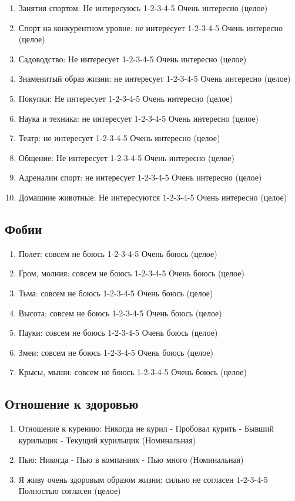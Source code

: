 \documentclass[11pt]{article}
\begin{document}
\begin{enumerate}
\item Занятия спортом: Не интересуюсь 1-2-3-4-5 Очень интересно (целое)
\item Спорт на конкурентном уровне: не интересует 1-2-3-4-5 Очень интересно (целое)
\item Садоводство: Не интересует 1-2-3-4-5 Очень интересно (целое)
\item Знаменитый образ жизни: не интересует 1-2-3-4-5 Очень интересно (целое)
\item Покупки: Не интересует 1-2-3-4-5 Очень интересно (целое)
\item Наука и техника: не интересует 1-2-3-4-5 Очень интересно (целое)
\item Театр: не интересует 1-2-3-4-5 Очень интересно (целое)
\item Общение: Не интересует 1-2-3-4-5 Очень интересно (целое)
\item Адреналин спорт: не интересует 1-2-3-4-5 Очень интересно (целое)
\item Домашние животные: Не интересуются 1-2-3-4-5 Очень интересно (целое)
\end{enumerate}
\subsection{Фобии}
\begin{enumerate}
\item Полет: совсем не боюсь 1-2-3-4-5 Очень боюсь (целое)
\item Гром, молния: совсем не боюсь 1-2-3-4-5 Очень боюсь (целое)
\item Тьма: совсем не боюсь 1-2-3-4-5 Очень боюсь  (целое)
\item Высота: совсем не боюсь  1-2-3-4-5 Очень боюсь  (целое)
\item Пауки: совсем не боюсь 1-2-3-4-5 Очень боюсь  (целое)
\item Змеи: совсем не боюсь 1-2-3-4-5 Очень боюсь  (целое)
\item Крысы, мыши: совсем не боюсь 1-2-3-4-5 Очень боюсь (целое)
\end{enumerate}
\subsection{Отношение к здоровью}
\begin{enumerate}
\item Отношение к курению: Никогда не курил - Пробовал курить - Бывший курильщик - Текущий курильщик (Номинальная)
\item Пью: Никогда - Пью в компаниях - Пью много (Номинальная)
\item Я живу очень здоровым образом жизни: сильно не согласен 1-2-3-4-5 Полностью согласен (целое)
\end{enumerate}
\end{document}
